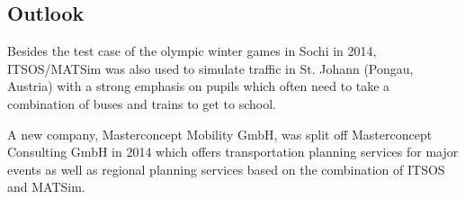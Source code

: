 \subsection{Outlook}

Besides the test case of the olympic winter games in Sochi in 2014, ITSOS/MATSim
was also used to simulate traffic in St. Johann (Pongau, Austria) with a strong
emphasis on pupils which often need to take a combination of buses and trains to
get to school.

A new company, Masterconcept Mobility GmbH, was split off Masterconcept
Consulting GmbH in 2014 which offers transportation planning services for major
events as well as regional planning services based on the combination of ITSOS
and MATSim.


